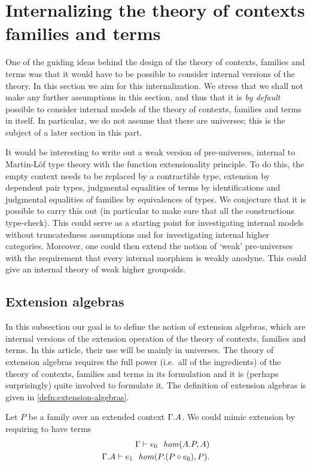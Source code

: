 \section{Internalizing the theory of contexts families and terms}
One of the guiding ideas behind the design of the theory of contexts, families
and terms was that it would have to be possible to consider internal versions
of the theory. In this section we aim for this internalization. We stress that
we shall not make any further assumptions in this section, and thus that
it is \emph{by default} possible to consider internal models of the theory
of contexts, families and terms in itself. In particular, we do not assume that
there are universes; this is the subject of a later section in this part.

It would be interesting to write out a weak version of pre-universes, internal
to Martin-L\"of type theory with the function extensionality principle. 
To do this, the empty context needs to
be replaced by a contractible type, extension by dependent pair types,
judgmental equalities of terms by identifications and judgmental equalities
of families by equivalences of types. We conjecture that it is possible to
carry this out (in particular to make sure that all the constructions 
type-check). This could serve as a starting point for investigating internal
models without truncatedness assumptions and for investigating internal higher
categories. 
Moreover, one could then extend the notion of `weak' pre-universes
with the requirement that every internal morphism is weakly anodyne. This
could give an internal theory of weak higher groupoids.

\subsection{Extension algebras}\label{sec:extension-algebras}
In this subsection our goal is to define the notion of extension algebras,
which are internal versions of the extension operation of the theory of
contexts, families and terms. In this article, their use will be mainly in
universes. The theory of extension algebras requires the full power (i.e.~all
of the ingredients) of the theory of contexts, families and terms in its
formulation and it is (perhaps surprisingly) quite involved to formulate it.
The definition of extension algebras is given in \autoref{defn:extension-algebras}.

Let $P$ be a family over an extended context $\ctxext{\Gamma}{A}$. We could
mimic extension by requiring to have terms
\begin{align*}
\jalign\jhom{\Gamma}{{A}{P}}{A}{e_0}\\
\jalign\jhom{{\Gamma}{A}}{{P}{\jcomp{}{e_0}{P}}}{P}{e_1}.
\end{align*}

